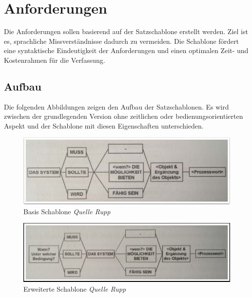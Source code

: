 \newpage

\section{Anforderungen}\label{anforderungen-1}

Die Anforderungen sollen basierend auf der Satzschablone erstellt
werden. Ziel ist es, sprachliche Missverständnisse dadurch zu vermeiden.
Die Schablone fördert eine syntaktische Eindeutigkeit der Anforderungen
und einen optimalen Zeit- und Kostenrahmen für die Verfassung.

\subsection{Aufbau}\label{aufbau}

Die folgenden Abbildungen zeigen den Aufbau der Satzschablonen. Es wird
zwischen der grundlegenden Version ohne zeitlichen oder
bedienungsorientierten Aspekt und der Schablone mit diesen Eigenschaften
unterschieden.

\begin{figure}[htbp]
\centering
\includegraphics{images/basis-schablone.jpg}
\caption[Basis Schablone \emph{Quelle Rupp}]{Basis Schablone
\emph{Quelle Rupp}\footnotemark{}}
\end{figure}

\begin{figure}[htbp]
\centering
\includegraphics{images/erweiterte-schablone.jpg}
\caption[Erweiterte Schablone \emph{Quelle Rupp}]{Erweiterte Schablone
\emph{Quelle Rupp}\footnotemark{}}
\end{figure}

